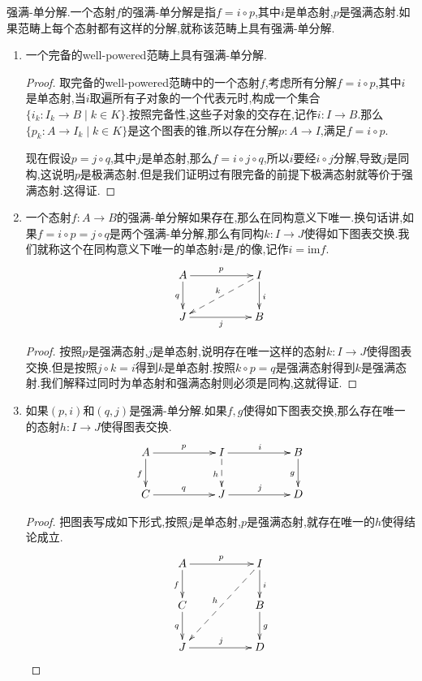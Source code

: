 强满-单分解.一个态射$f$的强满-单分解是指$f=i\circ p$,其中$i$是单态射,$p$是强满态射.如果范畴上每个态射都有这样的分解,就称该范畴上具有强满-单分解.
\begin{enumerate}
	\item 一个完备的well-powered范畴上具有强满-单分解.
	\begin{proof}
		
		取完备的well-powered范畴中的一个态射$f$,考虑所有分解$f=i\circ p$,其中$i$是单态射,当$i$取遍所有子对象的一个代表元时,构成一个集合$\{i_k:I_k\to B\mid k\in K\}$.按照完备性,这些子对象的交存在,记作$i:I\to B$.那么$\{p_k:A\to I_k\mid k\in K\}$是这个图表的锥,所以存在分解$p:A\to I$,满足$f=i\circ p$.
		
		\qquad
		
		现在假设$p=j\circ q$,其中$j$是单态射,那么$f=i\circ j\circ q$,所以$i$要经$i\circ j$分解,导致$j$是同构,这说明$p$是极满态射.但是我们证明过有限完备的前提下极满态射就等价于强满态射.这得证.
	\end{proof}
    \item 一个态射$f:A\to B$的强满-单分解如果存在,那么在同构意义下唯一.换句话讲,如果$f=i\circ p=j\circ q$是两个强满-单分解,那么有同构$k:I\to J$使得如下图表交换.我们就称这个在同构意义下唯一的单态射$i$是$f$的像,记作$i=\mathrm{im}f$.
    $$\xymatrix{A\ar[rr]^p\ar[d]_q&&I\ar[d]^i\ar@{-->}[dll]_k\\J\ar[rr]_j&&B}$$
    \begin{proof}
    	
        按照$p$是强满态射,$j$是单态射,说明存在唯一这样的态射$k:I\to J$使得图表交换.但是按照$j\circ k=i$得到$k$是单态射.按照$k\circ p=q$是强满态射得到$k$是强满态射.我们解释过同时为单态射和强满态射则必须是同构,这就得证.
    \end{proof}
    \item 如果$(p,i)$和$(q,j)$是强满-单分解.如果$f,g$使得如下图表交换,那么存在唯一的态射$h:I\to J$使得图表交换.
    $$\xymatrix{A\ar[rr]^p\ar[d]_f&&I\ar[rr]^i\ar@{-->}[d]_h&&B\ar[d]_g\\C\ar[rr]^q&&J\ar[rr]^j&&D}$$
    \begin{proof}
    	
    	把图表写成如下形式,按照$j$是单态射,$p$是强满态射,就存在唯一的$h$使得结论成立.
    	$$\xymatrix{A\ar[rr]^p\ar[d]_f&&I\ar[d]^i\ar@{-->}[ddll]_h\\C\ar[d]_q&&B\ar[d]^g\\J\ar[rr]^j&&D}$$
    \end{proof}
\end{enumerate}

